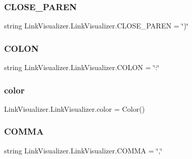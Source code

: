\subsubsection{\texorpdfstring{C\+L\+O\+S\+E\+\_\+\+P\+A\+R\+EN}{CLOSE\_PAREN}}
{\footnotesize\ttfamily string Link\+Visualizer.\+Link\+Visualizer.\+C\+L\+O\+S\+E\+\_\+\+P\+A\+R\+EN = \char`\"{})\char`\"{}\hspace{0.3cm}{\ttfamily [static]}}

\hypertarget{class_link_visualizer_1_1_link_visualizer_a179dcb192b99a210729db42add346470}{}\label{class_link_visualizer_1_1_link_visualizer_a179dcb192b99a210729db42add346470} 
\subsubsection{\texorpdfstring{C\+O\+L\+ON}{COLON}}
{\footnotesize\ttfamily string Link\+Visualizer.\+Link\+Visualizer.\+C\+O\+L\+ON = \char`\"{}\+:\char`\"{}\hspace{0.3cm}{\ttfamily [static]}}

\hypertarget{class_link_visualizer_1_1_link_visualizer_a534ed7a306063db52d7b668542f1ebb5}{}\label{class_link_visualizer_1_1_link_visualizer_a534ed7a306063db52d7b668542f1ebb5} 
\subsubsection{\texorpdfstring{color}{color}}
{\footnotesize\ttfamily Link\+Visualizer.\+Link\+Visualizer.\+color = Color()\hspace{0.3cm}{\ttfamily [static]}}

\hypertarget{class_link_visualizer_1_1_link_visualizer_ad224a39d19962af54d0726969daa2de2}{}\label{class_link_visualizer_1_1_link_visualizer_ad224a39d19962af54d0726969daa2de2} 
\subsubsection{\texorpdfstring{C\+O\+M\+MA}{COMMA}}
{\footnotesize\ttfamily string Link\+Visualizer.\+Link\+Visualizer.\+C\+O\+M\+MA = \char`\"{},\char`\"{}\hspace{0.3cm}{\ttfamily [static]}}

